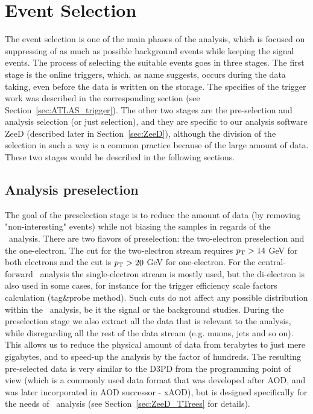 \chapter{Event Selection}
\label{sec:Selection}

The event selection is one of the main phases of the analysis, which is focused on suppressing of as much as possible background events while keeping the signal events. The process of selecting the suitable events goes in three stages. The first stage is the online triggers, which, as name suggests, occurs during the data taking, even before the data is written on the storage. The specifies of the trigger work was described in the corresponding section (see Section~\ref{sec:ATLAS_trigger}). The other two stages are the pre-selection and analysis selection (or just selection), and they are specific to our analysis software ZeeD (described later in Section~\ref{sec:ZeeD}), although the division of the selection in such a way is a common practice because of the large amount of data. These two stages would be described in the following sections.

\section{Analysis preselection}
\label{sec:Sel_pre-sel}

The goal of the preselection stage is to reduce the amount of data (by removing "non-interesting" events) while not biasing the samples in regards of the \Zee\ analysis. There are two flavors of preselection: the two-electron preselection and the one-electron. The cut for the two-electron stream requires $p_{\mathrm{T}} > 14$ GeV for both electrons and the cut is $p_{\mathrm{T}} > 20$ GeV for one-electron. For the central-forward \Zee\ analysis the single-electron stream is mostly used, but the di-electron is also used in some cases, for instance for the trigger efficiency scale factors calculation (tag\&probe method). Such cuts do not affect any possible distribution within the \Zee\ analysis, be it the signal or the background studies. During the preselection stage we also extract all the data that is relevant to the analysis, while disregarding all the rest of the data stream (e.g. muons, jets and so on). This allows us to reduce the physical amount of data from terabytes to just mere gigabytes, and to speed-up the analysis by the factor of hundreds. The resulting pre-selected data is very similar to the D3PD from the programming point of view (which is a commonly used data format that was developed after AOD, and was later incorporated in AOD successor - xAOD), but is designed specifically for the needs of \Zee\ analysis (see Section~\ref{sec:ZeeD_TTrees} for details).

